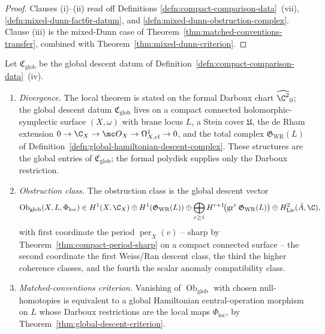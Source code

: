 \begin{proof}
  Clauses (i)--(ii) read off
  Definitions \ref{defn:compact-comparison-data}~(vii),
  \ref{defn:mixed-dunn-fact6r-datum}, and
  \ref{defn:mixed-dunn-obstruction-complex}.  Clause (iii) is the
  mixed-Dunn case of Theorem~\ref{thm:matched-conventions-transfer},
  combined with Theorem~\ref{thm:mixed-dunn-criterion}.
\end{proof}

\begin{thm}\label{thm:divergence-global-ham}
  Let \(\mathfrak C_{\mathrm{glob}}\) be the global descent datum of
  Definition~\ref{defn:compact-comparison-data}~(iv).
  \begin{enumerate}[label=(\roman*)]
    \item \emph{Divergence.}  The local theorem is stated on the
      formal Darboux chart \(\widehat{\C^2}_0\); the global descent
      datum \(\mathfrak C_{\mathrm{glob}}\) lives on a compact
      connected holomorphic-symplectic surface \((X,\omega)\) with
      brane locus \(L\), a Stein cover \(\mathfrak U\), the de Rham
      extension
      \(0\to\C_X\to\mc O_X\to\Omega^1_{X,\mathrm{cl}}\to0\), and the
      total complex \(\mathfrak G_{\mathrm{WR}}(L)\) of
      Definition~\ref{defn:global-hamiltonian-descent-complex}.  These
      structures are the global entries of
      \(\mathfrak C_{\mathrm{glob}}\); the formal polydisk supplies only
      the Darboux restriction.
    \item \emph{Obstruction class.}  The obstruction class is
      the global descent vector
      \[
        \operatorname{Ob}_{\mathrm{glob}}(X,L,\Phi_{\mathrm{loc}})
          \in
          H^1(X,\C_X)
            \oplus H^1(\mathfrak G_{\mathrm{WR}}(L))
            \oplus
            \bigoplus_{r\ge1}
              H^{r+1}\!\bigl(
                \operatorname{gr}^r\mathfrak G_{\mathrm{WR}}(L)
              \bigr)
            \oplus H^2_{\mathrm{Lie}}(\bar A,\C),
      \]
      with first coordinate the period
      \(\operatorname{per}_X(v)\) -- sharp by
      Theorem~\ref{thm:compact-period-sharp} on a compact connected
      surface -- the second coordinate the first Weiss/Ran descent
      class, the third the higher coherence classes, and the fourth
      the scalar anomaly compatibility class.
    \item \emph{Matched-conventions criterion.}  Vanishing of
      \(\operatorname{Ob}_{\mathrm{glob}}\) with chosen null-homotopies
      is equivalent to a global Hamiltonian central-operation
      morphism on \(L\) whose Darboux restrictions are the local maps
      \(\Phi_{\mathrm{loc}}\), by
      Theorem~\ref{thm:global-descent-criterion}.
  \end{enumerate}
\end{thm}

